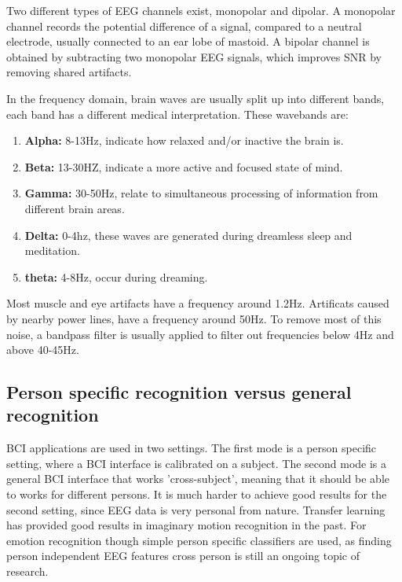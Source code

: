 
Two different types of EEG channels exist, monopolar and dipolar. A monopolar channel records the potential difference of a signal, compared to a neutral electrode, usually connected to an ear lobe of mastoid. A bipolar channel is obtained by subtracting two monopolar EEG signals, which improves SNR by removing shared artifacts\cite{MonoBiPolar}. 

In the frequency domain, brain waves are usually split up into different bands\cite{EmotionRelativePower,WavesSite}, each band has a different medical interpretation. These wavebands \label{wavebands} are:
\begin{enumerate}
\item \textbf{Alpha:} 8-13Hz, indicate how relaxed and/or inactive the brain is.
\item \textbf{Beta:} 13-30HZ, indicate a more active and focused state of mind.
\item \textbf{Gamma:} 30-50Hz, relate to simultaneous processing of information from different brain areas.
\item \textbf{Delta:} 0-4hz, these waves are generated during dreamless sleep and meditation.
\item \textbf{theta:} 4-8Hz, occur during dreaming.
\end{enumerate}
Most muscle and eye artifacts have a frequency around 1.2Hz. Artificats caused by nearby power lines, have a frequency around 50Hz\cite{ExtendedPaper}. To remove most of this noise, a bandpass filter is usually applied to filter out frequencies below 4Hz and above 40-45Hz.

\subsection{Person specific recognition versus general recognition}
BCI applications are used in two settings. The first mode is a person specific setting, where a BCI interface is calibrated on a subject. The second mode is a general BCI interface that works 'cross-subject', meaning that it should be able to works for different persons. It is much harder to achieve good results for the second setting, since EEG data is very personal from nature. Transfer learning has provided good results in imaginary motion recognition in the past. For emotion recognition though simple person specific classifiers are used, as finding person independent EEG features cross person is still an ongoing topic of research. %


